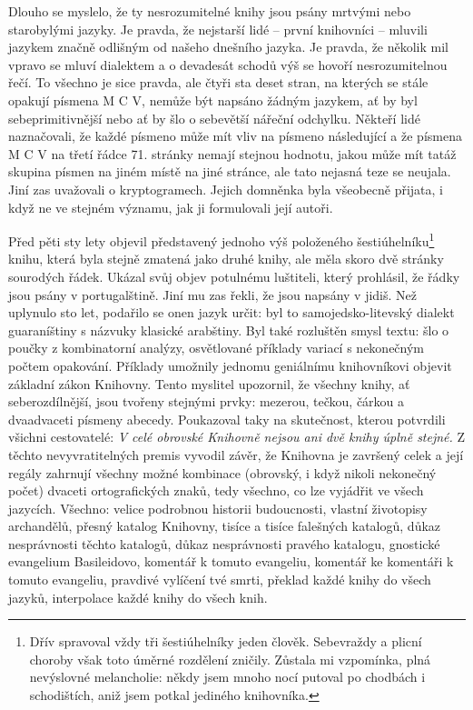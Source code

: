 \documentclass[11pt]{article}
\begin{document}
Dlouho se myslelo, že ty nesrozumitelné knihy jsou psány mrtvými nebo starobylými jazyky. Je pravda, že nejstarší lidé -- první knihovníci -- mluvili jazykem značně odlišným od našeho dnešního jazyka. Je pravda, že několik mil vpravo se mluví dialektem a o devadesát schodů výš se hovoří nesrozumitelnou řečí. To všechno je sice pravda, ale čtyři sta deset stran, na kterých se stále opakují písmena M C V, nemůže být napsáno žádným jazykem, ať by byl sebeprimitivnější nebo ať by šlo o sebevětší nářeční odchylku. Někteří lidé naznačovali, že každé písmeno může mít vliv na písmeno následující a že písmena M C V na třetí řádce 71. stránky nemají stejnou hodnotu, jakou může mít tatáž skupina písmen na jiném místě na jiné stránce, ale tato nejasná teze se neujala. Jiní zas uvažovali o kryptogramech. Jejich domněnka byla všeobecně přijata, i když ne ve stejném významu, jak ji formulovali její autoři.

Před pěti sty lety objevil představený jednoho výš položeného šestiúhelníku\footnote{Dřív spravoval vždy tři šestiúhelníky jeden člověk. Sebevraždy a plicní choroby však toto úměrné rozdělení zničily. Zůstala mi vzpomínka, plná nevýslovné melancholie: někdy jsem mnoho nocí putoval po chodbách i schodištích, aniž jsem potkal jediného knihovníka.} knihu, která byla stejně zmatená jako druhé knihy, ale měla skoro dvě stránky sourodých řádek. Ukázal svůj objev potulnému luštiteli, který prohlásil, že řádky jsou psány v portugalštině. Jiní mu zas řekli, že jsou napsány v jidiš. Než uplynulo sto let, podařilo se onen jazyk určit: byl to samojedsko-litevský dialekt guaraníštiny s názvuky klasické arabštiny. Byl také rozluštěn smysl textu: šlo o poučky z kombinatorní analýzy, osvětlované příklady variací s nekonečným počtem opakování. Příklady umožnily jednomu geniálnímu knihovníkovi objevit základní zákon Knihovny. Tento myslitel upozornil, že všechny knihy, ať seberozdílnější, jsou tvořeny stejnými prvky: mezerou, tečkou, čárkou a dvaadvaceti písmeny abecedy. Poukazoval taky na skutečnost, kterou potvrdili všichni cestovatelé: \textit{V celé obrovské Knihovně nejsou ani dvě knihy úplně stejné.} Z těchto nevyvratitelných premis vyvodil závěr, že Knihovna je završený celek a její regály zahrnují všechny možné kombinace (obrovský, i když nikoli nekonečný počet) dvaceti ortografických znaků, tedy všechno, co lze vyjádřit ve všech jazycích. Všechno: velice podrobnou historii budoucnosti, vlastní životopisy archandělů, přesný katalog Knihovny, tisíce a tisíce falešných katalogů, důkaz nesprávnosti těchto katalogů, důkaz nesprávnosti pravého katalogu, gnostické evangelium Basileidovo, komentář k tomuto evangeliu, komentář ke komentáři k tomuto evangeliu, pravdivé vylíčení tvé smrti, překlad každé knihy do všech jazyků, interpolace každé knihy do všech knih.
\end{document}
